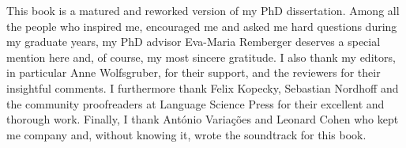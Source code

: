 \addchap{\lsAcknowledgementTitle} 

 
This book is a matured and reworked version of my PhD dissertation. Among all the people who inspired me, encouraged me and asked me hard questions during my graduate years, my PhD advisor Eva-Maria Remberger deserves a special mention here and, of course, my most sincere gratitude.  I also thank my editors, in particular Anne Wolfsgruber, for their support, and the  reviewers for their insightful comments. I furthermore thank Felix Kopecky, Sebastian Nordhoff and the community proofreaders at Language Science Press for their excellent and thorough work.
Finally, I thank António Variações and Leonard Cohen who kept me company and, without knowing it, wrote the soundtrack for this book.
